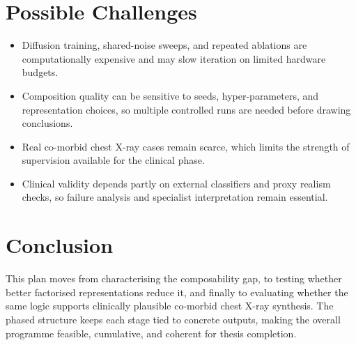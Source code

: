 \section{Possible Challenges}
\vspace{-0.35em}
\begin{itemize}[leftmargin=1.4em,itemsep=0.2em,topsep=0.25em,parsep=0pt,partopsep=0pt]
    \item Diffusion training, shared-noise sweeps, and repeated ablations are computationally expensive and may slow iteration on limited hardware budgets.
    \item Composition quality can be sensitive to seeds, hyper-parameters, and representation choices, so multiple controlled runs are needed before drawing conclusions.
    \item Real co-morbid chest X-ray cases remain scarce, which limits the strength of supervision available for the clinical phase.
    \item Clinical validity depends partly on external classifiers and proxy realism checks, so failure analysis and specialist interpretation remain essential.
\end{itemize}
\vspace{-0.8em}

\section{Conclusion}
\vspace{-0.35em}
This plan moves from characterising the composability gap, to testing whether better factorised representations reduce it, and finally to evaluating whether the same logic supports clinically plausible co-morbid chest X-ray synthesis. The phased structure keeps each stage tied to concrete outputs, making the overall programme feasible, cumulative, and coherent for thesis completion.
\endgroup
